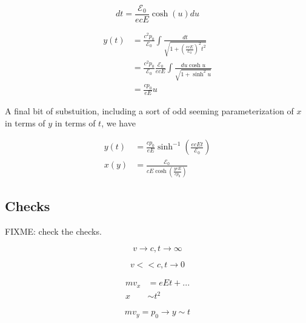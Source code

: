 \begin{equation}\label{eqn:relativisticElectrodynamicsT3:380}
dt = \frac{\mathcal{E}_0}{ e c E} \cosh(u) du
\end{equation}

\begin{align*}
y(t) 
&= \frac{c^2 p_0}{\mathcal{E}_0} \int \frac{dt}{\sqrt{1 + (\frac{e c E}{\mathcal{E}_0})^2 t^2 }} \\
&= \frac{c^2 p_0}{\mathcal{E}_0} 
\frac{\mathcal{E}_0}{ e c E} 
\int \frac{ du \cosh u }{\sqrt{1 + \sinh^2 u }} \\
&= \frac{c p_0}{ e E} u 
\end{align*}

A final bit of substuition, including a sort of odd seeming parameterization of $x$ in terms of $y$ in terms of $t$, we have

\begin{equation}\label{eqn:relativisticElectrodynamicsT3:400}
\boxed{
\begin{aligned}
y(t) &= \frac{c p_0}{ e E} \sinh^{-1} \left( \frac{e c E t}{\mathcal{E}_0} \right) \\
x(y) &= \frac{\mathcal{E}_0}{c E \cosh \left( \frac{y e E }{ c p_0} \right) }
\end{aligned}
}
\end{equation}

\subsection{Checks}

FIXME: check the checks.

\begin{equation}\label{eqn:relativisticElectrodynamicsT3:420}
v \rightarrow c, t \rightarrow \infty
\end{equation}

\begin{equation}\label{eqn:relativisticElectrodynamicsT3:440}
v << c, t \rightarrow 0
\end{equation}

\begin{align*}
m v_x &= e E t + ... \\
x &\sim t^2 
\end{align*}

\begin{equation}\label{eqn:relativisticElectrodynamicsT3:460}
m v_y = p_0 \rightarrow y \sim t
\end{equation}

